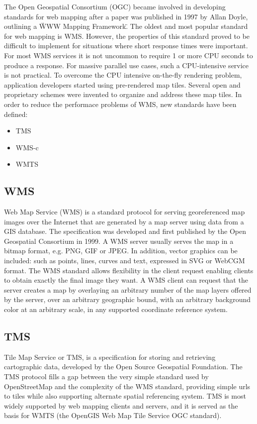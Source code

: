 \documentclass[11pt,a4paper,titlepage,oneside]{report}
\begin{document}
  The Open Geospatial Consortium (OGC) became involved in developing standards for web mapping after a paper was published in 1997 by Allan Doyle, outlining a \"WWW Mapping Framework\". The oldest and most popular standard for web mapping is WMS. However, the properties of this standard proved to be difficult to implement for situations where short response times were important. For most WMS services it is not uncommon to require 1 or more CPU seconds to produce a response. For massive parallel use cases, such a CPU-intensive service is not practical. To overcome the CPU intensive on-the-fly rendering problem, application developers started using pre-rendered map tiles. Several open and proprietary schemes were invented to organize and address these map tiles. 
  In order to reduce the performace problems of WMS, new standards have been defined:
  \begin{itemize}
    \item TMS
    \item WMS-c
    \item WMTS
  \end{itemize}
  
  \subsection{WMS}
    Web Map Service (WMS) is a standard protocol for serving georeferenced map images over the Internet that are generated by a map server using data from a GIS database. The specification was developed and first published by the Open Geospatial Consortium in 1999.
    A WMS server usually serves the map in a bitmap format, e.g. PNG, GIF or JPEG. In addition, vector graphics can be included: such as points, lines, curves and text, expressed in SVG or WebCGM format.
    The WMS standard allows flexibility in the client request enabling clients to obtain exactly the final image they want. A WMS client can request that the server creates a map by overlaying an arbitrary number of the map layers offered by the server, over an arbitrary geographic bound, with an arbitrary background color at an arbitrary scale, in any supported coordinate reference system.

  \subsection{TMS}
    Tile Map Service or TMS, is a specification for storing and retrieving cartographic data, developed by the Open Source Geospatial Foundation. The TMS protocol fills a gap between the very simple standard used by OpenStreetMap and the complexity of the WMS standard, providing simple urls to tiles while also supporting alternate spatial referencing system.
    TMS is most widely supported by web mapping clients and servers, and it is served as the basis for WMTS (the OpenGIS Web Map Tile Service OGC standard).
\end{document}
